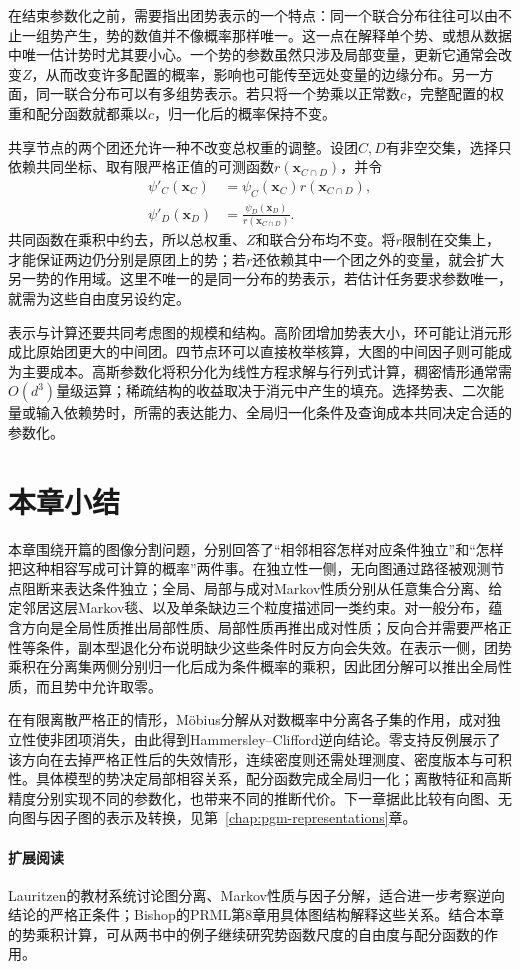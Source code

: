 在结束参数化之前，需要指出团势表示的一个特点：同一个联合分布往往可以由不止一组势产生，势的数值并不像概率那样唯一。这一点在解释单个势、或想从数据中唯一估计势时尤其要小心。一个势的参数虽然只涉及局部变量，更新它通常会改变$Z$，从而改变许多配置的概率，影响也可能传至远处变量的边缘分布。另一方面，同一联合分布可以有多组势表示。若只将一个势乘以正常数$c$，完整配置的权重和配分函数就都乘以$c$，归一化后的概率保持不变。

共享节点的两个团还允许一种不改变总权重的调整。设团$C,D$有非空交集，选择只依赖共同坐标、取有限严格正值的可测函数$r(\bm{x}_{C\cap D})$，并令
\[
  \begin{aligned}
    \psi'_C(\bm{x}_C)
      &=\psi_C(\bm{x}_C)r(\bm{x}_{C\cap D}),\\
    \psi'_D(\bm{x}_D)
      &=\frac{\psi_D(\bm{x}_D)}{r(\bm{x}_{C\cap D})}.
  \end{aligned}
\]
共同函数在乘积中约去，所以总权重、$Z$和联合分布均不变。将$r$限制在交集上，才能保证两边仍分别是原团上的势；若$r$还依赖其中一个团之外的变量，就会扩大另一势的作用域。这里不唯一的是同一分布的势表示，若估计任务要求参数唯一，就需为这些自由度另设约定。

表示与计算还要共同考虑图的规模和结构。高阶团增加势表大小，环可能让消元形成比原始团更大的中间团。四节点环可以直接枚举核算，大图的中间因子则可能成为主要成本。高斯参数化将积分化为线性方程求解与行列式计算，稠密情形通常需$O(d^3)$量级运算；稀疏结构的收益取决于消元中产生的填充。选择势表、二次能量或输入依赖势时，所需的表达能力、全局归一化条件及查询成本共同决定合适的参数化。

\section{本章小结}
\label{sec:pgm-undirected-summary}

本章围绕开篇的图像分割问题，分别回答了“相邻相容怎样对应条件独立”和“怎样把这种相容写成可计算的概率”两件事。在独立性一侧，无向图通过路径被观测节点阻断来表达条件独立；全局、局部与成对Markov性质分别从任意集合分离、给定邻居这层Markov毯、以及单条缺边三个粒度描述同一类约束。对一般分布，蕴含方向是全局性质推出局部性质、局部性质再推出成对性质；反向合并需要严格正性等条件，副本型退化分布说明缺少这些条件时反方向会失效。在表示一侧，团势乘积在分离集两侧分别归一化后成为条件概率的乘积，因此团分解可以推出全局性质，而且势中允许取零。

在有限离散严格正的情形，Möbius分解从对数概率中分离各子集的作用，成对独立性使非团项消失，由此得到Hammersley--Clifford逆向结论。零支持反例展示了该方向在去掉严格正性后的失效情形，连续密度则还需处理测度、密度版本与可积性。具体模型的势决定局部相容关系，配分函数完成全局归一化；离散特征和高斯精度分别实现不同的参数化，也带来不同的推断代价。下一章据此比较有向图、无向图与因子图的表示及转换，见第~\ref{chap:pgm-representations}章。

\paragraph{扩展阅读}
Lauritzen的教材系统讨论图分离、Markov性质与因子分解，适合进一步考察逆向结论的严格正条件；Bishop的PRML第8章用具体图结构解释这些关系。结合本章的势乘积计算，可从两书中的例子继续研究势函数尺度的自由度与配分函数的作用。
